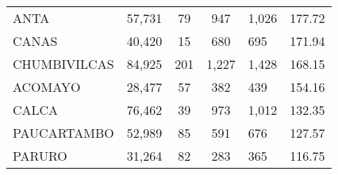 \begin{tabular}{lrcclr}
	\cellcolor[HTML]{FFFF99}ANTA                                   & 57,731                                                         & 79                                                         & 947                  & 1,026                                                               & 177.72                                                                       \\
	\cellcolor[HTML]{FFFF99}CANAS                                  & 40,420                                                         & 15                                                         & 680                  & 695                                                                 & 171.94                                                                       \\
	\cellcolor[HTML]{C6E0B4}CHUMBIVILCAS                           & 84,925                                                         & 201                                                        & 1,227                & 1,428                                                               & 168.15                                                                       \\
	\cellcolor[HTML]{C6E0B4}ACOMAYO                                & 28,477                                                         & 57                                                         & 382                  & 439                                                                 & 154.16                                                                       \\
	\cellcolor[HTML]{C6E0B4}CALCA                                  & 76,462                                                         & 39                                                         & 973                  & 1,012                                                               & 132.35                                                                       \\
	\cellcolor[HTML]{C6E0B4}PAUCARTAMBO                            & 52,989                                                         & 85                                                         & 591                  & 676                                                                 & 127.57                                                                       \\
	\cellcolor[HTML]{C6E0B4}PARURO                                 & 31,264                                                         & 82                                                         & 283                  & 365                                                                 & 116.75                                                                       \\

\end{tabular}
